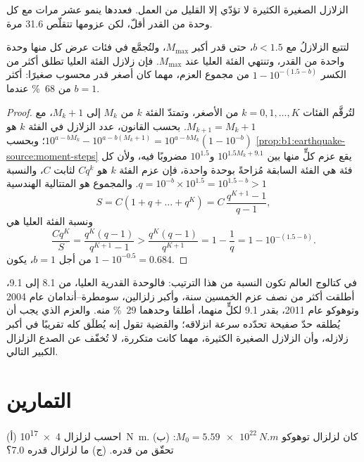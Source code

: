 الزلازل الصغيرة الكثيرة لا تؤدّي إلا القليل من العمل. فعددها ينمو عشر مرات مع كل وحدة من القدر أقلّ، لكن عزومها تتقلّص 31.6 مرة.

\begin{proposition}\label{prop:b1:earthquake-source:largest}
لتتبع الزلازلُ  مع $b < 1.5$، حتى قدر أكبر $M_{\max}$، ولتُجمَّع في فئات عرض كل منها وحدة واحدة من القدر، وتنتهي الفئة العليا عند $M_{\max}$. فإن زلازل الفئة العليا تطلق أكثر من الكسر $1 - 10^{-(1.5 - b)}$ من مجموع العزم، مهما كان أصغر قدر محسوب صغيرًا: أكثر من \qty{68}{\percent} عندما $b = 1$.
\end{proposition}

\begin{proof}
لتُرقَّم الفئات $k = 0, 1, \dots, K$ من الأصغر، وتمتدّ الفئة $k$ من $M_k$ إلى $M_k + 1$، مع $M_{k+1} = M_k + 1$. بحسب القانون، عدد الزلازل في الفئة $k$ هو $10^{a - bM_k} - 10^{a - b(M_k+1)} =
10^{a - bM_k}(1 - 10^{-b})$؛
وبحسب \cref{prop:b1:earthquake-source:moment-steps} يقع عزم كلٍّ منها بين $10^{1.5M_k + 9.1}$ و$10^{1.5}$ مضروبًا فيه، ولأن كل فئة هي الفئة السابقة مُزاحةً بوحدة واحدة، فإن عزم الفئة $k$ هو $C q^k$ لثابت $C$، والنسبة $q = 10^{-b}\times10^{1.5} = 10^{1.5 - b} > 1$. والمجموع هو المتتالية الهندسية
\[
  S = C(1 + q + \dots + q^K) = C\,\frac{q^{K+1} - 1}{q - 1} ,
\]
ونسبة الفئة العليا هي
\[
  \frac{C q^K}{S} = \frac{q^K (q - 1)}{q^{K+1} - 1}
  > \frac{q^K (q - 1)}{q^{K+1}} = 1 - \frac1q = 1 - 10^{-(1.5 - b)} .
\]
من أجل $b = 1$، يكون $1 - 10^{-0.5} = 0.684$.
\end{proof}

في كتالوج العالم تكون النسبة من هذا الترتيب: فالوحدة القدرية العليا، من 8.1 إلى 9.1، أطلقت أكثر من نصف عزم الخمسين سنة، وأكبر زلزالين، سومطرة--أندامان عام 2004 وتوهوكو عام 2011، بقدر 9.1 لكلٍّ منهما، أطلقا وحدهما \qty{29}{\percent} منه. والعزم الذي يجب أن يُطلقه حدّ صفيحة تحدّده سرعة انزلاقه؛ والقضية تقول إنه يُطلَق كله تقريبًا في أكبر زلازله، وأن الزلازل الصغيرة الكثيرة، مهما كانت متكررة، لا تُخفّف عن الصدع الزلزال الكبير التالي.

\section{التمارين}

\begin{exercise}[$\star$]\label{exo:b1:earthquake-source:1}
(أ) احسب  لزلزال  \qty{4e17}{N.m}. (ب) كان لزلزال توهوكو $M_0 = \qty{5.59e22}{N.m}$: تحقّق من قدره. (ج) ما  لزلزال قدره 7.0؟
\end{exercise}

